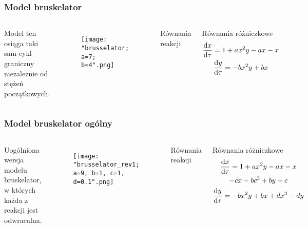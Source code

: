 \documentclass{beamer}
\begin{document}
\begin{frame}
\frametitle{Model bruskelator}
\begin{columns}
Model ten osiąga taki sam cykl graniczny niezależnie od stężeń początkowych. 
\begin{figure}
\texttt{[image: "brusselator; a=7; b=4".png]}
\end{figure}
\begin{block}{Równania reakcji}
\begin{center}
	 \\
	 \\
	 \\
\end{center}
\end{block}
\begin{block}{Równania różniczkowe}
\begin{gather*}
	\dv{x}{\tau} = 1+ax^{2}y-ax-x \\
	\dv{y}{\tau} = -bx^{2}y+bx
\end{gather*}
\end{block}
\end{columns}
\end{frame}

\begin{frame}
\frametitle{Model bruskelator ogólny}
\begin{columns}
Uogólniona wersja modelu bruskelator, w których każda z reakcji jest odwracalna. 
\begin{figure}
\texttt{[image: "brusselator\_rev1; a=9, b=1, c=1, d=0.1".png]}
\end{figure}
\begin{block}{Równania reakcji}
\begin{center}
	 \\
	 \\
	 \\
\end{center}
\end{block}
\begin{block}{Równania różniczkowe}
\begin{gather*}
	\dv{x}{\tau} = 1 + ax^{2}y - ax - x \\
	- cx - bc^{3} + by + c \\
	\dv{y}{\tau} = -bx^{2}y + bx + dx^{3} - dy
\end{gather*}
\end{block}
\end{columns}
\end{frame}
\end{document}
